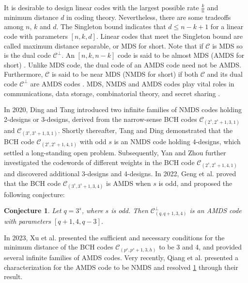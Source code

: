 \documentclass[sn-mathphys-num]{sn-jnl}%
\theoremstyle{thmstyleone}%
\theoremstyle{thmstyletwo}%
\newtheorem{conjecture}{Conjecture}
\theoremstyle{thmstylethree}%
\begin{document}
It is desirable to design linear codes with the largest possible rate $\frac{k}{n}$ and minimum distance $d$ in coding theory. Nevertheless, there are some tradeoffs among $n$, $k$ and $d$. The Singleton bound indicates that $d\le n-k+1$ for a linear code with parameters $[n,k,d]$. Linear codes that meet the Singleton bound are called maximum distance separable, or MDS for short. Note that if $\mathcal{C}$ is MDS so is the dual code $\mathcal{C}^\perp$. An $[n,k,n-k]$ code is said to be almost MDS (AMDS for short) \cite{Boer1996AlmostMDSCodes}. Unlike MDS code, the dual code of an AMDS code need not be AMDS. Furthermore, $\mathcal{C}$ is said to be near MDS (NMDS for short) if both $\mathcal{C}$ and its dual code $\mathcal{C}^\perp$ are AMDS codes \cite{Dodunekov1995NearMDSCodes}. MDS, NMDS and AMDS codes play vital roles in communications, data storage, combinatorial theory, and secret sharing \cite{Ding2020InfiniteFamiliesMDS,Tang2021InfiniteFamilyLinear,Heng2022ConstructionsMDSNear,Xu2022InfiniteFamiliedDesigns,Yan2022InfiniteFamiliesLinear,Li2024MDSCodesConjecture,Heng2023NewInfiniteFamilies,Dodunekova1997AlmostMDSNearMDSCodes,Xiang2022SomeDesignsBCH,Zhou2009SecretSharingScheme}.

In 2020, Ding and Tang \cite{Ding2020InfiniteFamiliesMDS} introduced two infinite families of NMDS codes holding 2-designs or 3-designs, derived from the narrow-sense BCH codes $\mathcal{C}_{(2^s,2^s+1,3,1)}$ and $\mathcal{C}_{(3^s,3^s+1,3,1)}$. Shortly thereafter, Tang and Ding \cite{Tang2021InfiniteFamilyLinear} demonstrated that the BCH code $\mathcal{C}_{(2^s,2^s+1,4,1)}$ with odd $s$ is an NMDS code holding 4-designs, which settled a long-standing open problem. Subsequently, Yan and Zhou \cite{Yan2022InfiniteFamiliesLinear} further investigated the codewords of different weights in the BCH code $\mathcal{C}_{(2^s,2^s+1,4,1)}$ and discovered additional 3-designs and 4-designs. In 2022, Geng et al. \cite{Geng2022ClassAlmostMDS} proved that the BCH code $\mathcal{C}_{(3^s,3^s+1,3,4)}$ is AMDS when $s$ is odd, and proposed the following conjecture:
\begin{conjecture}\cite[Conjecture 3.6]{Geng2022ClassAlmostMDS}
	\label{sec1 conj1}
	Let $q=3^s$, where $s$ is odd. Then $\mathcal{C}^\perp_{(q,q+1,3,4)}$ is an AMDS code with parameters $[q+1,4,q-3]$.
\end{conjecture}
\noindent In 2023, Xu et al. \cite{Xu2023InfiniteFamiliesMDS} presented the sufficient and necessary conditions for the minimum distance of the BCH codes $\mathcal{C}_{(p^s,p^s+1,3,h)}$ to be 3 and 4, and provided several infinite families of AMDS codes. Very recently, Qiang et al. \cite{Qiang2024CharacterizationAlmost} presented a characterization for the AMDS code to be NMDS and resolved \cref{sec1 conj1} through their result.
\end{document}
